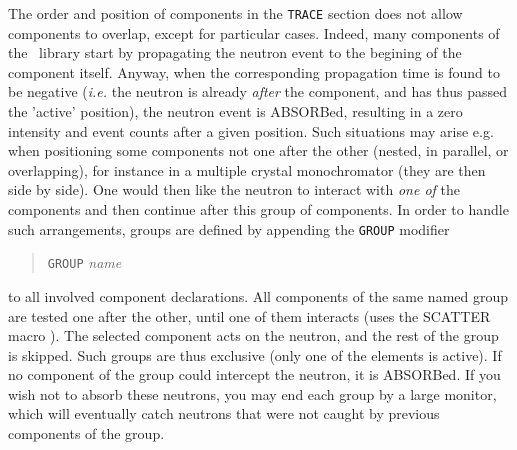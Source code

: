 The order and position of components in the \texttt{TRACE} section does not
allow components to overlap, except for particular cases.
Indeed, many components of the \MCS\ library  start
by propagating the neutron event to the begining of the component itself.
Anyway, when the corresponding propagation time is found to be negative
({\it i.e.} the neutron is already \emph{after} the component, and has thus
passed the 'active' position), the neutron event is ABSORBed, resulting in a zero intensity and event counts after a given position. Such situations
may arise e.g. when positioning some components not one after the other (nested, in parallel, or overlapping), for
instance in a multiple crystal monochromator (they are then side by side). One
would then like the neutron to interact with \emph{one of} the components and
then continue after this group of components. In order to handle such
arrangements, groups are defined by appending the \texttt{GROUP} modifier
\begin{quote}
  \texttt{GROUP} \textit{name}
\end{quote}
to all involved component declarations. 
All components of the same named group are tested one after the other, until one of them interacts (uses the SCATTER macro ). The selected component acts on the neutron, and the rest of the group is skipped. Such groups are thus exclusive (only one of the elements is active).
If no component of the group could intercept the neutron, it is ABSORBed. If you wish not to absorb these neutrons, you may end each group by a large monitor, which will eventually catch neutrons that were not caught by previous components of the group.


